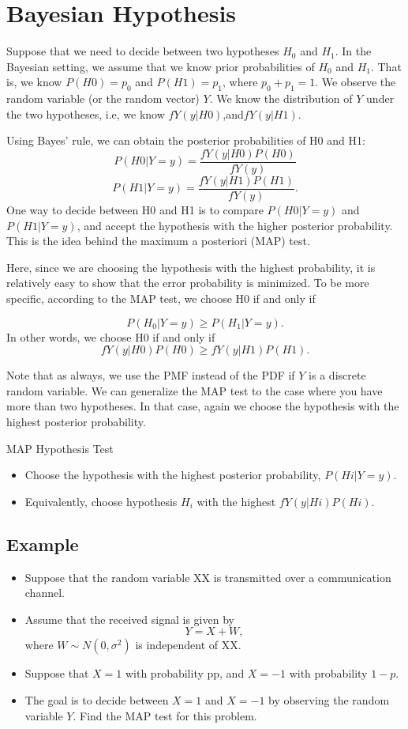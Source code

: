 \documentclass[]{report}
\begin{document}
\section{Bayesian Hypothesis }

Suppose that we need to decide between two hypotheses $H_0$ and $H_1$. In the Bayesian setting, we assume that we know prior probabilities of $H_0$ and $H_1$. That is, we know $P(H0)=p_0$ and $P(H1)=p_1$, where $p_0+p_1=1$. We observe the random variable (or the random vector) $Y$. We know the distribution of $Y$ under the two hypotheses, i.e, we know
$fY(y|H0)$,and$ fY(y|H1)$.

Using Bayes' rule, we can obtain the posterior probabilities of H0 and H1:
\[P(H0|Y=y)= \frac{fY(y|H0)P(H0)}{fY(y)}\]
\[P(H1|Y=y)= \frac{fY(y|H1)P(H1)}{fY(y)}.\]
One way to decide between H0 and H1 is to compare $P(H0|Y=y)$ and $P(H1|Y=y)$, and accept the hypothesis with the higher posterior probability. This is the idea behind the maximum a posteriori (MAP) test.

Here, since we are choosing the hypothesis with the highest probability, it is relatively easy to show that the error probability is minimized.
To be more specific, according to the MAP test, we choose H0 if and only if

\[P(H_0|Y=y)\geq P(H_1|Y=y).\]
In other words, we choose H0 if and only if
\[fY(y|H0)P(H0)\geq fY(y|H1)P(H1).\]

Note that as always, we use the PMF instead of the PDF if $Y$ is a discrete random variable. We can generalize the MAP test to the case where you have more than two hypotheses. In that case, again we choose the hypothesis with the highest posterior probability.

\begin{framed}
MAP Hypothesis Test
\begin{itemize}
\item Choose the hypothesis with the highest posterior probability, $P(Hi|Y=y)$.
\item Equivalently, choose hypothesis $H_i$ with the highest $fY(y|Hi)P(Hi)$.
\end{itemize}
\end{framed}

\subsection{Example}
\begin{itemize}
    \item Suppose that the random variable XX is transmitted over a communication channel. 
    \item Assume that the received signal is given by
\[Y=X+W,\]
where $W \sim  N(0,\sigma^2)$ is independent of XX. 
\item Suppose that $X=1$ with probability pp, and $X=−1$ with probability $1−p$. 
\item The goal is to decide between $X=1$ and $X=−1$ by observing the random variable $Y$. Find the MAP test for this problem.
\end{itemize}
\end{document}
